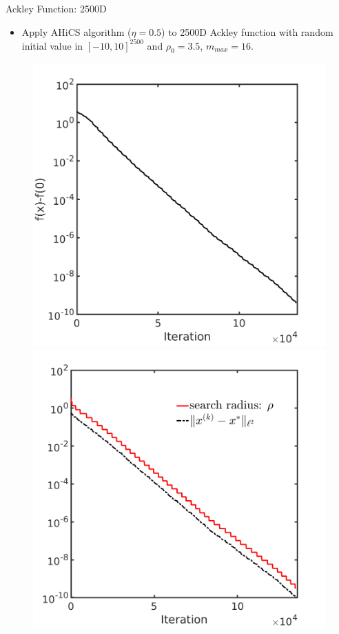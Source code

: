 \documentclass{beamer}
\begin{document}
\begin{frame}{Ackley Function: 2500D}
\footnotesize{
	\begin{itemize}
		\item Apply AHiCS algorithm ($\eta=0.5$) to 2500D Ackley function with
			random initial value in  $[-10,10]^{2500}$ and $\rho_0 = 3.5$, $m_{max}=16$.
	\end{itemize}
	}
\begin{figure}[!htbp]
	\centering
	  \includegraphics[scale=0.2]{./figures/ackley2500D.png}
	  \includegraphics[scale=0.2]{./figures/ackley2500D_dist.png}
\end{figure}


\end{frame}
\end{document}
